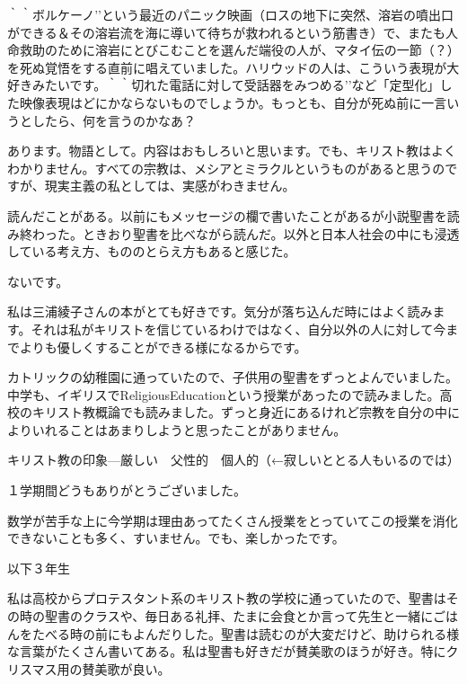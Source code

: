

\item
｀｀ボルケーノ’’という最近のパニック映画（ロスの地下に突然、溶岩の噴出口ができる＆その溶岩流を海に導いて待ちが救われるという筋書き）で、またも人命救助のために溶岩にとびこむことを選んだ端役の人が、マタイ伝の一節（？）を死ぬ覚悟をする直前に唱えていました。ハリウッドの人は、こういう表現が大好きみたいです。｀｀切れた電話に対して受話器をみつめる’’など「定型化」した映像表現はどにかならないものでしょうか。もっとも、自分が死ぬ前に一言いうとしたら、何を言うのかなあ？

\item
あります。物語として。内容はおもしろいと思います。でも、キリスト教はよくわかりません。すべての宗教は、メシアとミラクルというものがあると思うのですが、現実主義の私としては、実感がわきません。

\item
読んだことがある。以前にもメッセージの欄で書いたことがあるが小説聖書を読み終わった。ときおり聖書を比べながら読んだ。以外と日本人社会の中にも浸透している考え方、もののとらえ方もあると感じた。

\item
ないです。

私は三浦綾子さんの本がとても好きです。気分が落ち込んだ時にはよく読みます。それは私がキリストを信じているわけではなく、自分以外の人に対して今までよりも優しくすることができる様になるからです。

\item
カトリックの幼稚園に通っていたので、子供用の聖書をずっとよんでいました。中学も、イギリスでReligiousEducationという授業があったので読みました。高校のキリスト教概論でも読みました。ずっと身近にあるけれど宗教を自分の中によりいれることはあまりしようと思ったことがありません。

\item

キリスト教の印象—厳しい　父性的　個人的（←寂しいととる人もいるのでは）

１学期間どうもありがとうございました。

数学が苦手な上に今学期は理由あってたくさん授業をとっていてこの授業を消化できないことも多く、すいません。でも、楽しかったです。

\smallskip
以下３年生

\item
私は高校からプロテスタント系のキリスト教の学校に通っていたので、聖書はその時の聖書のクラスや、毎日ある礼拝、たまに会食とか言って先生と一緒にごはんをたべる時の前にもよんだりした。聖書は読むのが大変だけど、助けられる様な言葉がたくさん書いてある。私は聖書も好きだが賛美歌のほうが好き。特にクリスマス用の賛美歌が良い。

